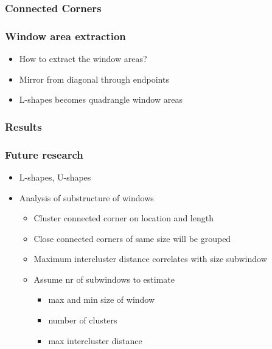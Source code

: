 \documentclass{beamer}
\begin{document}
\frame
{
}

\frame
{
	\frametitle{Connected Corners}

}

\frame
{
	\frametitle{Window area extraction}
	\begin{itemize}
	\item <+-| alert@+> How to extract the window areas?
	\item <+-| alert@+> Mirror from diagonal through endpoints
	\item <+-| alert@+> L-shapes becomes quadrangle window areas
	\end{itemize}
}

\frame
{
	\frametitle{Results}
}

\frame
{
	\frametitle{Future research}
	\begin{itemize}
	\item <+-| alert@+> L-shapes, U-shapes
	\item <+-| alert@+> Analysis of substructure of windows
	\begin{itemize}
		\item <+-| alert@+> Cluster connected corner on location and length
		\item <+-| alert@+> Close connected corners of same size will be grouped
		\item <+-| alert@+> Maximum intercluster distance correlates with size subwindow
		\item <+-| alert@+> Assume nr of subwindows to estimate 
		\begin{itemize}
			\item max and min size of window
			\item number of clusters
			\item max intercluster distance
		\end{itemize}
	\end{itemize}
	\end{itemize}
}
\end{document}
